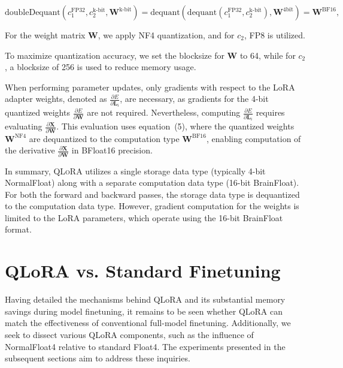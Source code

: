 \begin{equation}
    \text{doubleDequant}(c_1^{\text{FP32}}, c_2^{\text{k-bit}}, \mathbf{W}^{\text{k-bit}}) = \text{dequant}(\text{dequant}(c_1^{\text{FP32}}, c_2^{\text{k-bit}}), \mathbf{W}^{\text{4bit}}) = \mathbf{W}^{\text{BF16}},
\end{equation}

For the weight matrix $\mathbf{W}$, we apply NF4 quantization, and for $c_2$, FP8 is utilized.

To maximize quantization accuracy, we set the blocksize for $\mathbf{W}$ to 64, while for $c_2$, a blocksize of 256 is used to reduce memory usage.

When performing parameter updates, only gradients with respect to the LoRA adapter weights, denoted as $\frac{\partial E}{\partial \mathbf{L}_i}$, are necessary, as gradients for the 4-bit quantized weights $\frac{\partial E}{\partial \mathbf{W}}$ are not required. Nevertheless, computing $\frac{\partial E}{\partial \mathbf{L}_i}$ requires evaluating $\frac{\partial \mathbf{X}}{\partial \mathbf{W}}$. This evaluation uses equation~(5), where the quantized weights $\mathbf{W}^{\text{NF4}}$ are dequantized to the computation type $\mathbf{W}^{\text{BF16}}$, enabling computation of the derivative $\frac{\partial \mathbf{X}}{\partial \mathbf{W}}$ in BFloat16 precision.

In summary, \textsc{QLoRA} utilizes a single storage data type (typically 4-bit NormalFloat) along with a separate computation data type (16-bit BrainFloat). For both the forward and backward passes, the storage data type is dequantized to the computation data type. However, gradient computation for the weights is limited to the LoRA parameters, which operate using the 16-bit BrainFloat format.

\section{QLoRA vs. Standard Finetuning}
\label{sec:comp_to_std}

Having detailed the mechanisms behind QLoRA and its substantial memory savings during model finetuning, it remains to be seen whether QLoRA can match the effectiveness of conventional full-model finetuning. Additionally, we seek to dissect various QLoRA components, such as the influence of NormalFloat4 relative to standard Float4. The experiments presented in the subsequent sections aim to address these inquiries.

